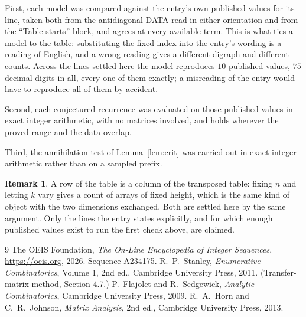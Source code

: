 \documentclass[11pt,a4paper]{article}
\theoremstyle{plain}
\theoremstyle{definition}
\newtheorem{remark}[theorem]{Remark}
\begin{document}
First, each model was compared against the entry's own published values for its line, taken
both from the antidiagonal DATA read in either orientation and from the ``Table starts''
block, and agrees at every available term. This is what ties a model to the table:
substituting the fixed index into the entry's wording is a reading of English, and a wrong
reading gives a different digraph and different counts. Across the lines settled here the
model reproduces $10$ published values, $75$ decimal digits in all, every one of
them exactly; a misreading of the entry would have to reproduce all of them by accident.

Second, each conjectured recurrence was evaluated on those published values in exact
integer arithmetic, with no matrices involved, and holds wherever the proved range and the
data overlap.

Third, the annihilation test of Lemma~\ref{lem:crit} was carried out in exact integer
arithmetic rather than on a sampled prefix.

\begin{remark}
A row of the table is a column of the transposed table: fixing $n$ and letting $k$ vary gives a
count of arrays of fixed height, which is the same kind of object with the two dimensions
exchanged. Both are settled here by the same argument. Only the lines the entry states
explicitly, and for which enough published values exist to run the first check above, are
claimed.
\end{remark}

\begin{thebibliography}{9}
 The OEIS Foundation, \emph{The On-Line Encyclopedia of Integer
Sequences}, \url{https://oeis.org}, 2026. Sequence A234175.
 R.~P.~Stanley, \emph{Enumerative Combinatorics}, Volume 1, 2nd ed.,
Cambridge University Press, 2011. (Transfer-matrix method, Section 4.7.)
 P.~Flajolet and R.~Sedgewick, \emph{Analytic Combinatorics}, Cambridge
University Press, 2009.
 R.~A.~Horn and C.~R.~Johnson, \emph{Matrix Analysis}, 2nd ed., Cambridge
University Press, 2013.
\end{thebibliography}
\end{document}
